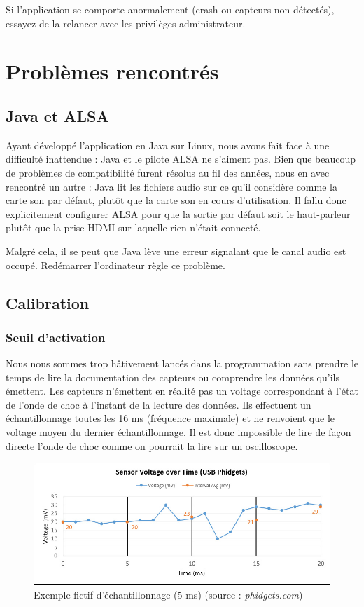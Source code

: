 \documentclass[11pt,a4paper,twoside,svgnames]{article}
\begin{document}
	Si l'application se comporte anormalement (crash ou capteurs non détectés), essayez de la relancer avec les privilèges administrateur.
	
	\section{Problèmes rencontrés}
	\subsection{Java et ALSA}
	Ayant développé l'application en Java sur Linux, nous avons fait face à une difficulté inattendue : Java et le pilote ALSA ne s'aiment pas. Bien que beaucoup de problèmes de compatibilité furent résolus au fil des années, nous en avec rencontré un autre : Java lit les fichiers audio sur ce qu'il considère comme la carte son par défaut, plutôt que la carte son en cours d'utilisation. Il fallu donc explicitement configurer ALSA pour que la sortie par défaut soit le haut-parleur plutôt que la prise HDMI sur laquelle rien n'était connecté.
	
	Malgré cela, il se peut que Java lève une erreur signalant que le canal audio est occupé. Redémarrer l'ordinateur règle ce problème.
	
	\subsection{Calibration}
	\subsubsection{Seuil d'activation}
	Nous nous sommes trop hâtivement lancés dans la programmation sans prendre le temps de lire la documentation des capteurs ou comprendre les données qu'ils émettent. Les capteurs n'émettent en réalité pas un voltage correspondant à l'état de l'onde de choc à l'instant de la lecture des données. Ils effectuent un échantillonnage toutes les 16 ms (fréquence maximale) et ne renvoient que le voltage moyen du dernier échantillonnage. Il est donc impossible de lire de façon directe l'onde de choc comme on pourrait la lire sur un oscilloscope.
	
	\begin{figure}[h]
		\includegraphics[width=\linewidth]{IntervalchangeUSB.jpg}
		\caption{\label{intervalchange}Exemple fictif d'échantillonnage (5 ms) (source : \textit{phidgets.com})}
	\end{figure}
	
\end{document}
